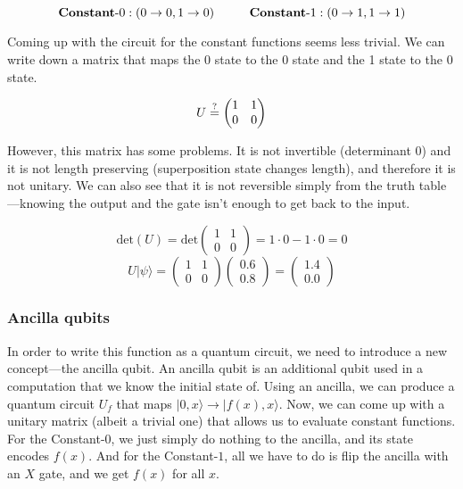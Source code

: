 \documentclass[12pt, letterpaper]{article}
\begin{document}
$$\textbf{Constant}\textrm{-}0 : (0 \rightarrow 0,  1 \rightarrow 0)
\hspace{1 cm}
\textbf{Constant}\textrm{-}1 : (0 \rightarrow 1,  1 \rightarrow 1)$$

\noindent
Coming up with the circuit for the constant functions seems less trivial. We can write down a matrix that maps the 0 state to the 0 state and the 1 state to the 0 state.

$$U \stackrel{?}{=} \left(\begin{matrix}
    1 & 1 \\
    0 & 0
\end{matrix}\right) \vspace{2 mm}$$

\noindent
However, this matrix has some problems. It is not invertible (determinant 0) and it is not length preserving (superposition state changes length), and therefore it is not unitary. We can also see that it is not reversible simply from the truth table—knowing the output and the gate isn’t enough to get back to the input.

$$\text{det}(U) = \text{det}\left(\begin{matrix}
    1 & 1 \\
    0 & 0
\end{matrix}\right) = 1\cdot0 - 1\cdot0 = 0$$
\vspace{2 mm}
$$U|\psi\rangle = \left(\begin{matrix}
    1 & 1 \\
    0 & 0
\end{matrix}\right)
\left(\begin{matrix}
    0.6 \\
    0.8
\end{matrix}\right) =
\left(\begin{matrix}
    1.4 \\
    0.0
\end{matrix}\right)$$

\subsubsection{Ancilla qubits}

In order to write this function as a quantum circuit, we need to introduce a new concept—the ancilla qubit. An ancilla qubit is an additional qubit used in a computation that we know the initial state of. Using an ancilla, we can produce a quantum circuit $U_f$ that maps $|0, x\rangle \rightarrow |f(x), x\rangle$. Now, we can come up with a unitary matrix (albeit a trivial one) that allows us to evaluate constant functions. For the Constant-$0$, we just simply do nothing to the ancilla, and its state encodes $f(x)$. And for the Constant-$1$, all we have to do is flip the ancilla with an $X$ gate, and we get $f(x)$ for all $x$.
\end{document}
